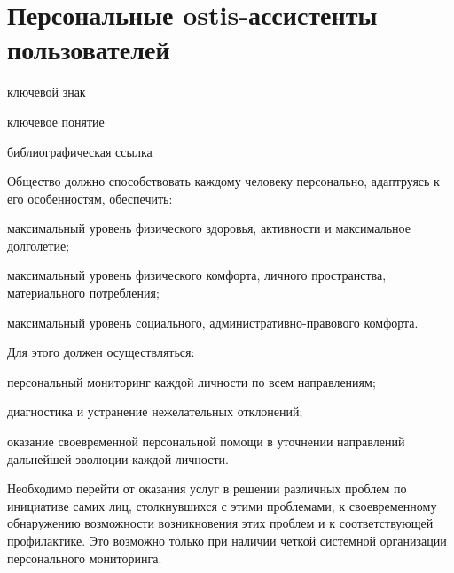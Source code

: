\section{Персональные ostis-ассистенты пользователей}
{\label{sec_ostis_assistant}} 

\begin{SCn}

\begin{scnrelfromlist}{ключевой знак}
\end{scnrelfromlist}

\begin{scnrelfromlist}{ключевое понятие}
\end{scnrelfromlist}

\begin{scnrelfromlist}{библиографическая ссылка}
\end{scnrelfromlist}

\end{SCn}

Общество должно способствовать каждому человеку персонально, адаптруясь к его особенностям, обеспечить:
\begin{textitemize}
    \item максимальный уровень физического здоровья, активности и максимальное долголетие;
    \item максимальный уровень физического комфорта, личного пространства, материального потребления;
    \item максимальный уровень социального, административно-правового комфорта.
\end{textitemize}

Для этого должен осуществляться:
\begin{textitemize}
    \item персональный мониторинг каждой личности по всем направлениям;
    \item диагностика и устранение нежелательных отклонений;
    \item оказание своевременной персональной помощи в уточнении направлений дальнейшей эволюции каждой личности.
\end{textitemize}

Необходимо перейти от оказания услуг в решении различных проблем по инициативе самих лиц, столкнувшихся с этими проблемами, к своевременному обнаружению возможности возникновения этих проблем и к соответствующей профилактике. 
Это возможно только при наличии четкой системной организации персонального мониторинга. 

